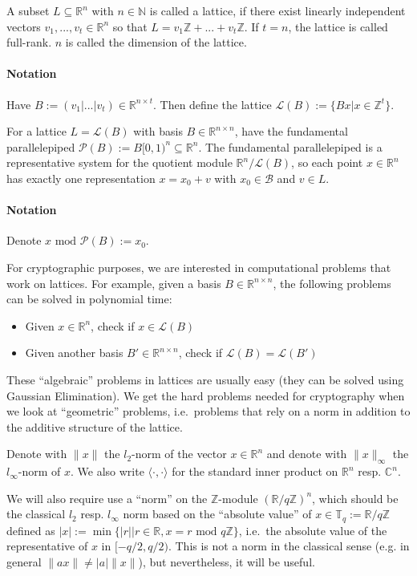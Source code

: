 \documentclass{report}
\newcommand{\T}{\mathbb{T}}
\newcommand{\Z}{\mathbb{Z}}
\newcommand{\R}{\mathbb{R}}
\renewcommand{\mod}{\text{ mod }}
\begin{document}
A subset $L \subseteq \R^n$ with $n \in \mathbb{N}$ is called a lattice, if there exist linearly independent vectors $v_1, ..., v_t \in \R^n$ so that $L = v_1 \Z + ... + v_t \Z$. If $t = n$, the lattice is called full-rank. $n$ is called the dimension of the lattice.
\paragraph{Notation} Have $B := (v_1 | ... | v_t) \in \R^{n \times t}$. Then define the lattice $\mathcal{L}(B) := \{ Bx | x \in \Z^t \}$.

For a lattice $L = \mathcal{L}(B)$ with basis $B \in \R^{n \times n}$, have the fundamental parallelepiped $\mathcal{P}(B) := B [0, 1)^n \subseteq \R^n$. The fundamental parallelepiped is a 	representative system for the quotient module $\R^n / \mathcal{L}(B)$, so each point $x \in \R^n$ has exactly one representation $x = x_0 + v$ with $x_0 \in \mathcal{B}$ and $v \in L$.
\paragraph{Notation} Denote $x \mod \mathcal{P}(B) := x_0$.

For cryptographic purposes, we are interested in computational problems that work on lattices. For example, given a basis $B \in \R^{n \times n}$, the following problems can be solved in polynomial time:
\begin{itemize}
\item Given $x \in \R^n$, check if $x \in \mathcal{L}(B)$
\item Given another basis $B' \in \R^{n \times n}$, check if $\mathcal{L}(B) = \mathcal{L}(B')$
\end{itemize}
These ``algebraic'' problems in lattices are usually easy (they can be solved using Gaussian Elimination). We get the hard problems needed for cryptography when we look at ``geometric'' problems, i.e.\ problems that rely on a norm in addition to the additive structure of the lattice.

\remark[Norm]
\label{lattice_norm}
Denote with $\|x\|$ the $l_2$-norm of the vector $x \in \R^n$ and denote with $\|x\|_\infty$ the $l_\infty$-norm of $x$. We also write $\langle \cdot, \cdot \rangle$ for the standard inner product on $\R^n$ resp. $\mathbb{C}^n$. 

We will also require use a ``norm'' on the $\Z$-module $(\R / q\Z)^n$, which should be the classical $l_2$ resp. $l_\infty$ norm based on the ``absolute value'' of $x \in \T_q := \R / q\Z$ defined as $| x | := \min \{ |r| | r \in \R , x = r \mod q\Z \}$, i.e.\ the absolute value of the representative of $x$ in $[ -q/2, q/2 )$. This is not a norm in the classical sense (e.g. in general $\| a x \| \neq | a | \| x \|$), but nevertheless, it will be useful.
\end{document}
